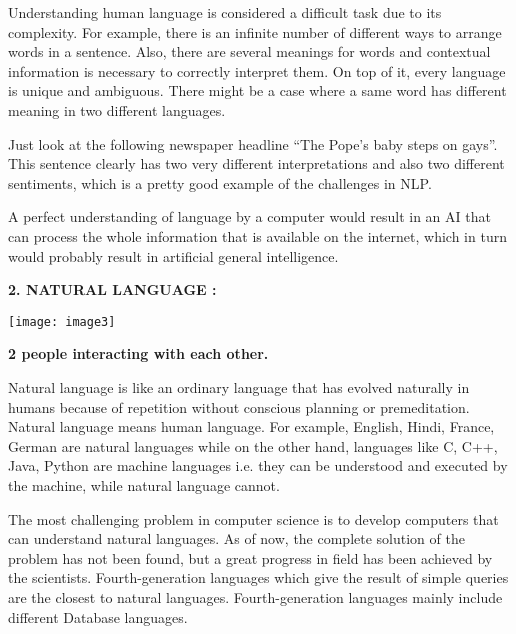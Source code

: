 \documentclass{article} %
\begin{document}
Understanding human language is considered a difficult task due to its complexity. For example, there is an infinite number of different ways to arrange words in a sentence. Also, there are several meanings for words and contextual information is necessary to correctly interpret them. On top of it, every language is unique and ambiguous. There might be a case where a same word has different meaning in two different languages.

Just look at the following newspaper headline ``The Pope's baby steps on gays''. This sentence clearly has two very different interpretations and also two different sentiments, which is a pretty good example of the challenges in NLP.

A perfect understanding of language by a computer would result in an AI that can process the whole information that is available on the internet, which in turn would probably result in artificial general intelligence.

\noindent \textbf{}

\noindent \textbf{}

\noindent \textbf{}

\noindent \textbf{}

\noindent \textbf{2. NATURAL LANGUAGE :}

\noindent \texttt{[image: image3]}\textbf{}

\noindent \textbf{2 people interacting with each other.}

Natural language is like an ordinary language that has evolved naturally in humans because of repetition without conscious planning or premeditation. Natural language means human language. For example, English, Hindi, France, German are natural languages while on the other hand, languages like C, C++, Java, Python are machine languages i.e. they can be understood and executed by the machine, while natural language cannot.

The most challenging problem in computer science is to develop computers that can understand natural languages. As of now, the complete solution of the problem has not been found, but a great progress in field has been achieved by the scientists. Fourth-generation languages which give the result of simple queries are the closest to natural languages. Fourth-generation languages mainly include different Database languages.

\noindent \textbf{}

\noindent \textbf{}
\end{document}
